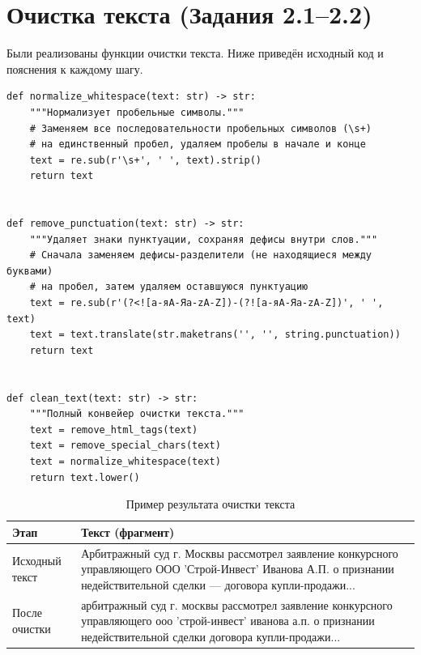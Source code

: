 \documentclass[12pt, a4paper]{report}
\begin{document}
\section{Очистка текста (Задания 2.1–2.2)}

Были реализованы функции очистки текста. Ниже приведён исходный код и пояснения к каждому шагу.

\begin{lstlisting}[caption={Реализация функций очистки текста}, label={lst:cleaning}]
def normalize_whitespace(text: str) -> str:
    """Нормализует пробельные символы."""
    # Заменяем все последовательности пробельных символов (\s+) 
    # на единственный пробел, удаляем пробелы в начале и конце
    text = re.sub(r'\s+', ' ', text).strip()
    return text


def remove_punctuation(text: str) -> str:
    """Удаляет знаки пунктуации, сохраняя дефисы внутри слов."""
    # Сначала заменяем дефисы-разделители (не находящиеся между буквами)
    # на пробел, затем удаляем оставшуюся пунктуацию
    text = re.sub(r'(?<![а-яА-Яa-zA-Z])-(?![а-яА-Яa-zA-Z])', ' ', text)
    text = text.translate(str.maketrans('', '', string.punctuation))
    return text


def clean_text(text: str) -> str:
    """Полный конвейер очистки текста."""
    text = remove_html_tags(text)
    text = remove_special_chars(text)
    text = normalize_whitespace(text)
    return text.lower()
\end{lstlisting}

\begin{table}[h]
  \centering
  \caption{Пример результата очистки текста}
  \label{tab:cleaning_example}
  \begin{tabularx}{\textwidth}{@{}l X@{}}
    \toprule
    \rowcolor{LightBlue}
    \textsf{\textbf{Этап}} & \textsf{\textbf{Текст (фрагмент)}} \\
    \midrule
    Исходный текст & 
    Арбитражный суд г. Москвы рассмотрел заявление конкурсного управляющего ООО 'Строй-Инвест' Иванова А.П. о признании недействительной сделки — договора купли-продажи... \\
    \midrule
    После очистки & 
    арбитражный суд г. москвы рассмотрел заявление конкурсного управляющего ооо 'строй-инвест' иванова а.п. о признании недействительной сделки договора купли-продажи... \\
    \bottomrule
  \end{tabularx}
\end{table}
\end{document}
